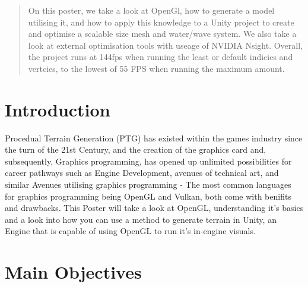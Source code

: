 \documentclass[a0,portrait]{a0poster}
\begin{document}
\begin{multicols}{2} %




\begin{abstract}
On this poster, we take a look at OpenGl, how to generate a model utilising it, and how to apply this knowledge to a Unity project to create and optimise a scalable size mesh and water/wave system. We also take a look  at external optimisation tools with useage of NVIDIA Nsight. Overall, the project runs at 144fps when running the least or default indicies and vertcies, to the lowest of 55 FPS when running the maximum amount.
\end{abstract}




\section*{Introduction}
Procedual Terrain Generation (PTG) has existed within the games industry since the turn of the 21st Century\cite{GPUEvo}, and the creation of the graphics card and, subsequently, Graphics programming, has opened up unlimited possibilities for career pathways such as Engine Development, avenues of technical art, and similar Avenues utilising graphics programming - The most common languages for graphics programming being OpenGL and Vulkan, both come with benifits and drawbacks. This Poster will take a look at OpenGL, understanding it's basics and a look into how you can use a method to generate terrain in Unity, an Engine that is capable of using OpenGL to run it's in-engine visuals.





\section*{Main Objectives}


\end{multicols}
\end{document}
